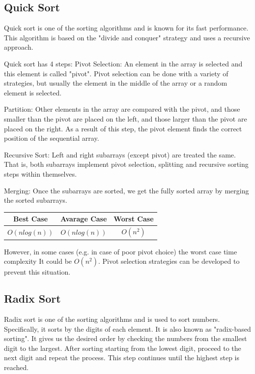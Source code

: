 \documentclass{article}
\begin{document}
\subsection{Quick Sort}
Quick sort is one of the sorting algorithms and is known for its fast performance. This algorithm is based on the "divide and conquer" strategy and uses a recursive approach.

Quick sort has 4 steps: 
Pivot Selection: An element in the array is selected and this element is called "pivot". Pivot selection can be done with a variety of strategies, but usually the element in the middle of the array or a random element is selected.

Partition: Other elements in the array are compared with the pivot, and those smaller than the pivot are placed on the left, and those larger than the pivot are placed on the right. As a result of this step, the pivot element finds the correct position of the sequential array.

Recursive Sort: Left and right subarrays (except pivot) are treated the same. That is, both subarrays implement pivot selection, splitting and recursive sorting steps within themselves.

Merging: Once the subarrays are sorted, we get the fully sorted array by merging the sorted subarrays.


\begin{center}
\begin{tabular}{|c|c|c|}
 \hline
Best Case & Avarage Case & Worst Case  \\
\hline
$O(nlog(n))$ &$ O(nlog(n))$ & $O(n^2)$ \\
\hline
\end{tabular}
\end{center}

However, in some cases (e.g. in case of poor pivot choice) the worst case time complexity
It could be $O(n^2)$. Pivot selection strategies can be developed to prevent this situation.

\subsection{Radix Sort}
Radix sort is one of the sorting algorithms and is used to sort numbers. Specifically, it sorts by the digits of each element. It is also known as "radix-based sorting".
It gives us the desired order by checking the numbers from the smallest digit to the largest. After sorting starting from the lowest digit, proceed to the next digit and repeat the process. This step continues until the highest step is reached.\\
\end{document}
